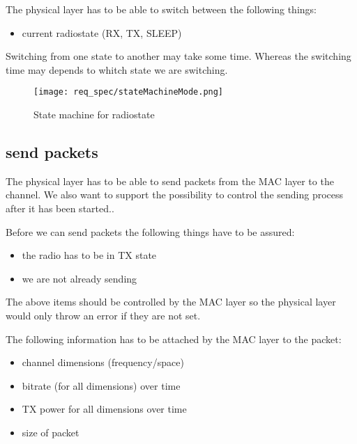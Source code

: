 The physical layer has to be able to switch between the following things:

\begin{itemize}
 \item current radiostate (RX, TX, SLEEP)
\end{itemize}

Switching from one state to another may take some time. Whereas the switching time may depends to whitch state we are switching.

\begin{figure}[t]
 \centering
 \texttt{[image: req\_spec/stateMachineMode.png]}
 \caption{State machine for radiostate}
 \label{fig: mode state machine}
\end{figure}

\pagebreak
\subsection{send packets}
\label{subSendPackets}

The physical layer has to be able to send packets from the MAC layer to the channel. 
We also want to support the possibility to control
the sending process after it has been started..

Before we can send packets the following things have to be 
assured:
\linebreak
\begin{itemize}
 \item the radio has to be in TX state
 \item we are not already sending
\end{itemize}

The above items should be controlled by the MAC layer so the physical layer would only throw an error if they are not set.

The following information has to be attached by the MAC layer to the packet:

\begin{itemize}

 \item channel dimensions (frequency/space)
 \item bitrate (for all dimensions) over time
 \item TX power for all dimensions over time
 
 \item size of packet
\end{itemize}


